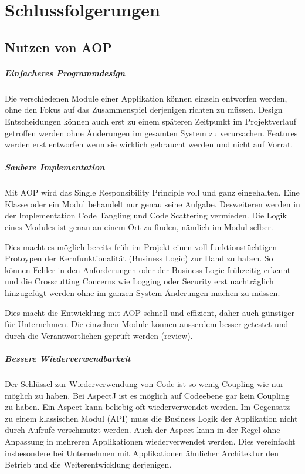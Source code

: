 \chapter{Schlussfolgerungen}
\label{chap:schlussfolgerungen}
\section{Nutzen von AOP}
\paragraph{Einfacheres Programmdesign}
Die verschiedenen Module einer Applikation können einzeln entworfen werden, ohne den Fokus auf das Zusammenspiel derjenigen richten zu müssen. Design Entscheidungen können auch erst zu einem späteren Zeitpunkt im Projektverlauf getroffen werden ohne Änderungen im gesamten System zu verursachen. Features werden erst entworfen wenn sie wirklich gebraucht werden und nicht \glqq{}auf Vorrat\grqq.
\paragraph{Saubere Implementation}
Mit AOP wird das Single Responsibility Principle voll und ganz eingehalten. Eine Klasse oder ein Modul behandelt nur genau seine Aufgabe. Desweiteren werden in der Implementation Code Tangling und Code Scattering vermieden. Die Logik eines Modules ist genau an einem Ort zu finden, nämlich im Modul selber.

Dies macht es möglich bereits früh im Projekt einen voll funktionstüchtigen Protoypen der Kernfunktionalität (Business Logic) zur Hand zu haben. So können Fehler in den Anforderungen oder der Business Logic frühzeitig erkennt und die Crosscutting Concerns wie Logging oder Security erst nachträglich hinzugefügt werden ohne im ganzen System Änderungen machen zu müssen.

Dies macht die Entwicklung mit AOP schnell und effizient, daher auch günstiger für Unternehmen. Die einzelnen Module können ausserdem besser getestet und durch die Verantwortlichen geprüft werden (review).
\paragraph{Bessere Wiederverwendbarkeit}
Der Schlüssel zur Wiederverwendung von Code ist so wenig Coupling wie nur möglich zu haben. Bei AspectJ ist es möglich auf Codeebene gar kein Coupling zu haben. Ein Aspect kann beliebig oft wiederverwendet werden. Im Gegensatz zu einem klassischen Modul (API) muss die Business Logik der Applikation nicht durch Aufrufe verschmutzt werden. Auch der Aspect kann in der Regel ohne Anpassung in mehreren Applikationen wiederverwendet werden. Dies vereinfacht insbesondere bei Unternehmen mit Applikationen ähnlicher Architektur den Betrieb und die Weiterentwicklung derjenigen. 
